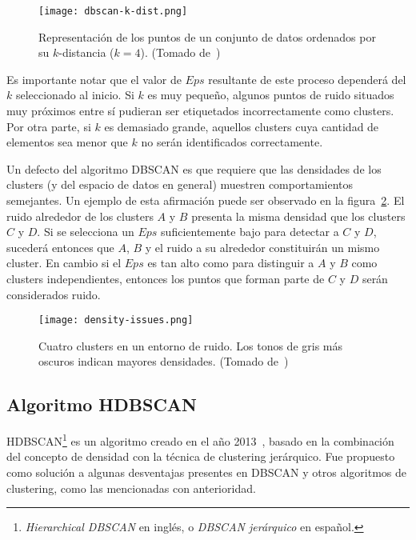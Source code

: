 \begin{figure}[!h]
    \centering
    \texttt{[image: dbscan-k-dist.png]}
    \caption{Representación de los puntos de un conjunto de datos ordenados por su $k$-distancia ($k=4$). (Tomado de~\cite{Tan05})}
    \label{img:dbscan-k-dist}
\end{figure}

Es importante notar que el valor de $Eps$ resultante de este proceso dependerá del $k$ seleccionado al inicio.
Si $k$ es muy pequeño, algunos puntos de ruido situados muy próximos entre sí pudieran ser etiquetados incorrectamente como clusters.
Por otra parte, si $k$ es demasiado grande, aquellos clusters cuya cantidad de elementos sea menor que $k$ no serán identificados correctamente.

Un defecto del algoritmo DBSCAN es que requiere que las densidades de los clusters (y del espacio de datos en general) muestren comportamientos semejantes.
Un ejemplo de esta afirmación puede ser observado en la figura~\ref{img:density-issues}.
El ruido alrededor de los clusters $A$ y $B$ presenta la misma densidad que los clusters $C$ y $D$.
Si se selecciona un $Eps$ suficientemente bajo para detectar a $C$ y $D$, sucederá entonces que $A$, $B$ y el ruido a su alrededor constituirán un mismo cluster.
En cambio si el $Eps$ es tan alto como para distinguir a $A$ y $B$ como clusters independientes, entonces los puntos que forman parte de $C$ y $D$ serán considerados ruido.

\begin{figure}[!h]
    \centering
    \texttt{[image: density-issues.png]}
    \caption{Cuatro clusters en un entorno de ruido.
    Los tonos de gris más oscuros indican mayores densidades. (Tomado de~\cite{Tan05})}
    \label{img:density-issues}
\end{figure}

\subsection{Algoritmo HDBSCAN}\label{subsec:HDBSCAN}

HDBSCAN\footnote{\textit{Hierarchical DBSCAN} en inglés, o \textit{DBSCAN jerárquico} en español.} es un algoritmo creado en el año 2013~\cite{Campello13}, basado en la combinación del concepto de densidad con la técnica de clustering jerárquico.
Fue propuesto como solución a algunas desventajas presentes en DBSCAN y otros algoritmos de clustering, como las mencionadas con anterioridad.

